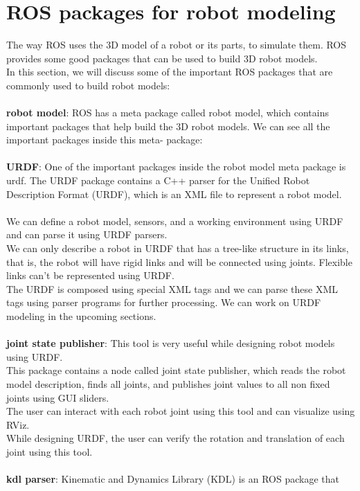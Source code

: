 \section{ROS packages for robot modeling}
The way ROS uses the 3D model of a robot or its parts, to simulate them. ROS provides some good packages that can be used to build 3D robot models.\\ In this
section, we will discuss some of the important ROS packages that are commonly used to
build robot models:
\\\\\textbf{robot model}: ROS has a meta package called robot model, which contains important 
packages that 
help build the 3D robot models. We can see all the important packages inside this meta-
package:
\\\\\textbf{URDF}: One of the important packages inside the robot model meta package is urdf. The 
URDF package contains a C++ parser for the Unified Robot Description Format (URDF),
which is an XML file to represent a robot model.
\\\\ We can define a robot model, sensors, and a working environment using URDF and 
can parse it using URDF parsers.
\\We can only describe a robot in URDF that has a tree-like 
structure in its links, that is, the robot will have rigid links and will be connected 
using joints. Flexible links can't be represented using URDF.
\\ The URDF is composed using special XML tags and we can parse these XML tags using 
parser programs for further processing. We can work on URDF modeling in the upcoming 
sections.
\\\\\textbf{joint state publisher}: This tool is very useful while designing robot 
models using URDF.
\\This package contains a node called joint state publisher, which reads the robot 
model description, finds all joints, and publishes joint values to all non fixed 
joints 
using GUI sliders. 
\\The user can interact with each robot joint using this tool and can visualize using 
RViz.
\\While designing URDF, the user can verify the rotation and translation of each 
joint using this tool. 
\\\\\textbf{kdl parser}: Kinematic and Dynamics Library (KDL) is an ROS package that 
